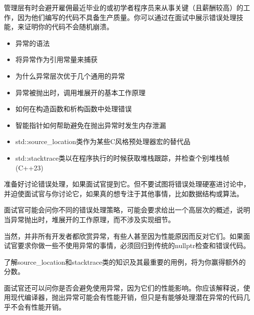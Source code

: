 
管理层有时会避开雇佣最近毕业的或初学者程序员来从事关键（且薪酬较高）的工作，因为他们编写的代码不具备生产质量。你可以通过在面试中展示错误处理技能，来证明你的代码不会随机崩溃。


\begin{itemize}
\item
异常的语法

\item
将异常作为引用常量来捕获

\item
为什么异常层次优于几个通用的异常

\item
异常被抛出时，调用堆展开的基本工作原理

\item
如何在构造函数和析构函数中处理错误

\item
智能指针如何帮助避免在抛出异常时发生内存泄漏

\item
std::source\_location类作为某些C风格预处理器宏的替代品

\item
std::stacktrace类以在程序执行的时候获取堆栈跟踪，并检查个别堆栈帧 (C++23)
\end{itemize}


准备好讨论错误处理，如果面试官提到它。但不要试图将错误处理硬塞进讨论中，并迫使面试官与你讨论它，如果真的想专注于其他事情，比如数据结构或算法。

面试官可能会问你不同的错误处理策略，可能会要求给出一个高层次的概述，说明当异常抛出时，堆展开的工作原理，而不涉及实现细节。

当然，并非所有开发者都欣赏异常，有些人甚至因为性能原因而反对它们。如果面试官要求你做一些不使用异常的事情，必须回归到传统的nullptr检查和错误代码。

了解source\_location和stacktrace类的知识及其最重要的用例，将为你赢得额外的分数。

面试官还可以问你是否会避免使用异常，因为它们的性能影响。你应该解释说，使用现代编译器，抛出异常可能会有性能开销，但只是有能够处理潜在异常的代码几乎不会有性能开销。

